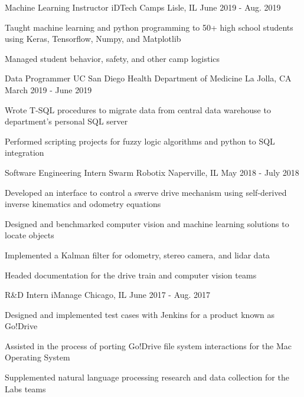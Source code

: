 
\begin{cventries}
  \cventry
    {Machine Learning Instructor} %
    {iDTech Camps} %
    {Lisle, IL} %
    {June 2019 - Aug. 2019} %
    {
      \begin{cvitems} %
        \item {Taught machine learning and python programming to 50+ high school students using Keras, Tensorflow, Numpy, and Matplotlib}
        \item {Managed student behavior, safety, and other camp logistics}
      \end{cvitems}
    }

  \cventry
    {Data Programmer} %
    {UC San Diego Health Department of Medicine} %
    {La Jolla, CA} %
    {March 2019 - June 2019} %
    {
      \begin{cvitems} %
        \item {Wrote T-SQL procedures to migrate data from central data warehouse to department's personal SQL server}
        \item {Performed scripting projects for fuzzy logic algorithms and python to SQL integration}
      \end{cvitems}
    }

  \cventry
    {Software Engineering Intern} %
    {Swarm Robotix} %
    {Naperville, IL} %
    {May 2018 - July 2018} %
    {
      \begin{cvitems} %
        \item {Developed an interface to control a swerve drive mechanism using self-derived inverse kinematics and odometry equations}
        \item {Designed and benchmarked computer vision and machine learning solutions to locate objects}
        \item {Implemented a Kalman filter for odometry, stereo camera, and lidar data}
        \item {Headed documentation for the drive train and computer vision teams}
      \end{cvitems}
    }

  \cventry
    {R\&D Intern} %
    {iManage} %
    {Chicago, IL} %
    {June 2017 - Aug. 2017} %
    {
      \begin{cvitems} %
        \item {Designed and implemented test cases with Jenkins for a product known as Go!Drive}
		\item {Assisted in the process of porting Go!Drive file system interactions for the Mac Operating System}
		\item {Supplemented natural language processing research and data collection for the Labs teams}
      \end{cvitems}
    }

 
\end{cventries}

